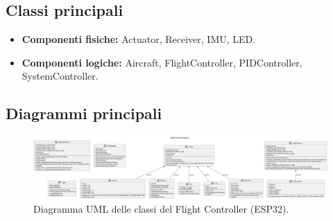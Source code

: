 \subsection{Classi principali}
\begin{itemize}
\item \textbf{Componenti fisiche:} Actuator, Receiver, IMU, LED.
\item \textbf{Componenti logiche:} Aircraft, FlightController, PIDController, SystemController.
\end{itemize}

\subsection{Diagrammi principali}
\begin{figure}[h!]
    \centering
    \includegraphics[width=\textwidth]{diagrams/esp32_class_diagram.png}
    \caption{Diagramma UML delle classi del Flight Controller (ESP32).}
    \label{fig:esp32_class_diagram}
\end{figure}

